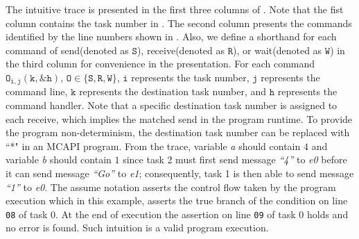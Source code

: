 The intuitive trace is presented in the first three columns of . Note that the fist column contains the task number in . The second column presents the commands identified by the line numbers shown in . Also, we define a shorthand for each command of send(denoted as $\mathtt{S}$), receive(denoted as $\mathtt{R}$), or wait(denoted as $\mathtt{W}$) in the third column for convenience in the presentation. For each command $\mathtt{O_{i,j}(k,\&h)}$, $\mathtt{O \in \{S,R,W\}}$, $\mathtt{i}$ represents the task number, $\mathtt{j}$ represents the command line, $\mathtt{k}$ represents the destination task number, and $\mathtt{h}$ represents the command handler. Note that a specific destination task number is assigned to each receive, which implies the matched send in the program runtime. To provide the program non-determinism, the destination task number can be replaced with ``*" in an MCAPI program. From the trace, variable \textit{a} should contain $4$ and variable
\textit{b} should contain $1$ since task 2 must first send message \textit{``4''}
to \textit{e0} before it can send message \textit{``Go''} to \textit{e1};
consequently, task 1 is then able to send message \textit{``1''} to
\textit{e0}. The assume notation asserts the control flow taken by the program execution which in this example, asserts the true branch of the condition on line \texttt{08} of task 0.  At the end of execution the assertion on line \texttt{09}
of task 0 holds and no error is found. Such intuition is a valid
program execution.

